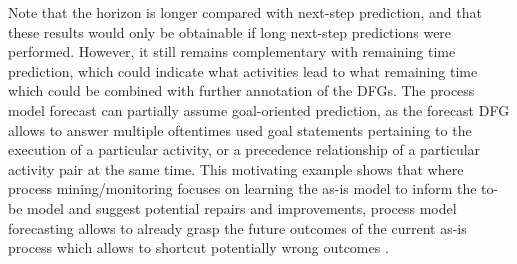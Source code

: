 Note that the horizon is longer compared with next-step prediction, and that these results would only be obtainable if long next-step predictions were performed.
However, it still remains complementary with remaining time prediction, which could indicate what activities lead to what remaining time which could be combined with further annotation of the DFGs.
The process model forecast can partially assume goal-oriented prediction, as the forecast DFG allows to answer multiple oftentimes used goal statements pertaining to the execution of a particular activity, or a precedence relationship of a particular activity pair \cite{DBLP:journals/tkdd/TeinemaaDRM19} at the same time.
This motivating example shows that where process mining/monitoring focuses on learning the as-is model to inform the to-be model and suggest potential repairs and improvements, process model forecasting allows to already grasp the future outcomes of the current as-is process which allows to shortcut potentially wrong outcomes \cite{DBLP:conf/bpm/PollPRRR18}.
